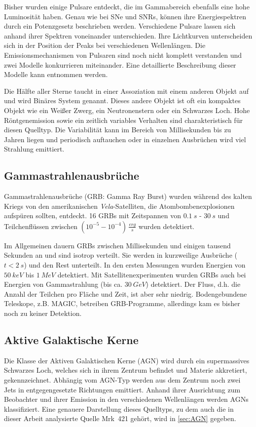 Bisher wurden einige Pulsare entdeckt, die im Gammabereich ebenfalls eine hohe Luminosität haben.
Genau wie bei SNe und SNRs, können ihre Energiespektren durch ein Potenzgesetz beschrieben werden.
Verschiedene Pulsare lassen sich anhand ihrer Spektren voneinander unterschieden.
Ihre Lichtkurven unterscheiden sich in der Position der Peaks bei verschiedenen Wellenlängen.
Die Emissionsmechanismen von Pulsaren sind noch nicht komplett verstanden und zwei Modelle konkurrieren miteinander.
Eine detaillierte Beschreibung dieser Modelle kann \cite{Weekes} entnommen werden.

Die Hälfte aller Sterne taucht in einer Assoziation mit einem anderen Objekt auf und wird Binäres System genannt.
Dieses andere Objekt ist oft ein kompaktes Objekt wie ein Weißer Zwerg, ein Neutronenstern oder ein Schwarzes Loch.
Hohe Röntgenemission sowie ein zeitlich variables Verhalten sind charakteristisch für diesen Quelltyp.
Die Variabilität kann im Bereich von Millisekunden bis zu Jahren liegen und periodisch auftauchen oder in einzelnen Ausbrüchen wird viel Strahlung emittiert.\cite{Weekes}


\subsection{Gammastrahlenausbrüche}
Gammastrahlenausbrüche (GRB: Gamma Ray Burst) wurden während des kalten Kriegs von den amerikanischen \textit{Vela}-Satelliten, die Atombombenexplosionen aufspüren sollten, entdeckt.
16 GRBs mit Zeitspannen von $\SI{0,1}{s}$ - $\SI{30}{s}$ und Teilchenflüssen zwischen $(10^{-5}-10^{-4})\,\frac{\si{erg}}{\si{s}}$ wurden detektiert.

Im Allgemeinen dauern GRBs zwischen Millisekunden und einigen tausend Sekunden an und sind isotrop verteilt.
Sie werden in kurzweilige Ausbrüche ($t<\SI{2}{s}$) und den Rest unterteilt.
In den ersten Messungen wurden Energien von $\SI{50}{keV}$ bis $\SI{1}{MeV}$ detektiert.
Mit Satellitenexperimenten wurden GRBs auch bei Energien von Gammastrahlung (bis ca. $\SI{30}{GeV}$) detektiert.
Der Fluss, d.h. die Anzahl der Teilchen pro Fläche und Zeit, ist aber sehr niedrig.
Bodengebundene Teleskope, z.B. MAGIC, betreiben GRB-Programme, allerdings kam es bisher noch zu keiner Detektion.\cite{Weekes}


\subsection{Aktive Galaktische Kerne}
Die Klasse der Aktiven Galaktischen Kerne (AGN) wird durch ein supermassives Schwarzes Loch, welches sich in ihrem Zentrum befindet und Materie akkretiert, gekennzeichnet.
Abhängig vom AGN-Typ werden aus dem Zentrum noch zwei Jets in entgegengesetzte Richtungen emittiert.  
Anhand ihrer Ausrichtung zum Beobachter und ihrer Emission in den verschiedenen Wellenlängen werden AGNs klassifiziert. 
Eine genauere Darstellung dieses Quelltyps, zu dem auch die in dieser Arbeit analysierte Quelle Mrk~421 gehört, wird in \autoref{sec:AGN} gegeben.

